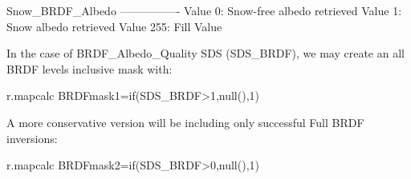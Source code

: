 \begin{smallverbatim}
Snow_BRDF_Albedo
----------------
 Value 0: Snow-free albedo retrieved  
 Value 1: Snow albedo retrieved 
 Value 255: Fill Value
\end{smallverbatim}

In the case of BRDF\_Albedo\_Quality SDS (SDS\_BRDF), we may create an all BRDF levels inclusive mask with:

\begin{smallverbatim}
 r.mapcalc BRDFmask1=if(SDS_BRDF>1,null(),1)
\end{smallverbatim}
 
A more conservative version will be including only successful Full BRDF inversions:

\begin{smallverbatim}
 r.mapcalc BRDFmask2=if(SDS_BRDF>0,null(),1)
\end{smallverbatim}


\address{GRASS Development Team\\
  \url{http://grass.osgeo.org}\\
  }


